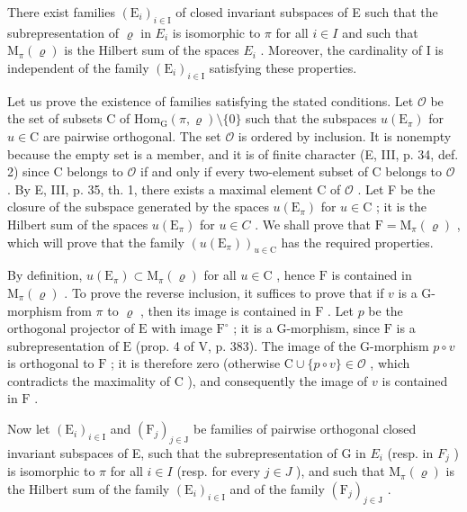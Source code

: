 There exist families \((\mathrm{E}_{i})_{i\in\mathrm{I}}\) of closed invariant subspaces of E such that the subrepresentation of \(\varrho\) in \(E_{i}\) is isomorphic to \(\pi\) for all \(i\in I\) and such that \(\mathrm{M}_{\pi}(\varrho)\) is the Hilbert sum of the spaces \(E_{i}\) . Moreover, the cardinality of I is independent of the family \((\mathrm{E}_{i})_{i\in\mathrm{I}}\) satisfying these properties.

Let us prove the existence of families satisfying the stated conditions. Let \(\mathcal{O}\) be the set of subsets C of \(\mathrm{Hom}_{\mathrm{G}}(\pi, \varrho)\setminus\{0\}\) such that the subspaces \(u(\mathrm{E}_{\pi})\) for \(u \in \mathrm{C}\) are pairwise orthogonal. The set \(\mathcal{O}\) is ordered by inclusion. It is nonempty because the empty set is a member, and it is of finite character (E, III, p. 34, def. 2) since C belongs to \(\mathcal{O}\) if and only if every two-element subset of C belongs to \(\mathcal{O}\) . By E, III, p. 35, th. 1, there exists a maximal element C of \(\mathcal{O}\) . Let F be the closure of the subspace generated by the spaces \(u(\mathrm{E}_{\pi})\) for \(u \in \mathrm{C}\) ; it is the Hilbert sum of the spaces \(u(\mathrm{E}_{\pi})\) for \(u \in C\) . We shall prove that \(\mathrm{F} = \mathrm{M}_{\pi}(\varrho)\) , which will prove that the family \((u(\mathrm{E}_{\pi}))_{u \in \mathrm{C}}\) has the required properties.

By definition, \(u(\mathrm{E}_{\pi}) \subset \mathrm{M}_{\pi}(\varrho)\) for all \(u \in \mathrm{C}\) , hence \(\mathrm{F}\) is contained in \(\mathrm{M}_{\pi}(\varrho)\) . To prove the reverse inclusion, it suffices to prove that if \(v\) is a G-morphism from \(\pi\) to \(\varrho\) , then its image is contained in \(\mathrm{F}\) . Let \(p\) be the orthogonal projector of \(\mathrm{E}\) with image \(\mathrm{F}^{\circ}\) ; it is a G-morphism, since \(\mathrm{F}\) is a subrepresentation of \(\mathrm{E}\) (prop. 4 of V, p. 383). The image of the G-morphism \(p \circ v\) is orthogonal to \(\mathrm{F}\) ; it is therefore zero (otherwise \(\mathrm{C} \cup \{p \circ v\} \in \mathcal{O}\) , which contradicts the maximality of \(\mathrm{C}\) ), and consequently the image of \(v\) is contained in \(\mathrm{F}\) .

Now let \((\mathrm{E}_{i})_{i\in\mathrm{I}}\) and \((\mathrm{F}_{j})_{j\in\mathrm{J}}\) be families of pairwise orthogonal closed invariant subspaces of E, such that the subrepresentation of G in \(E_{i}\) (resp. in \(F_{j}\) ) is isomorphic to \(\pi\) for all \(i\in I\) (resp. for every \(j\in J\) ), and such that \(\mathrm{M}_{\pi}(\varrho)\) is the Hilbert sum of the family \((\mathrm{E}_{i})_{i\in\mathrm{I}}\) and of the family \((\mathrm{F}_{j})_{j\in\mathrm{J}}\) .

